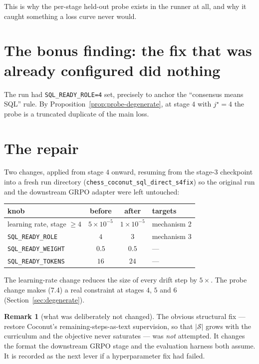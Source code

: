 \documentclass[11pt]{article}
\theoremstyle{definition}
\newtheorem{remark}[theorem]{Remark}
\begin{document}
This is why the per-stage held-out probe exists in the runner at all, and why it caught something a loss curve never would.

\section{The bonus finding: the fix that was already configured did nothing}

The run had \texttt{SQL\_READY\_ROLE=4} set, precisely to anchor the ``consensus means SQL'' rule. By Proposition~\ref{prop:probe-degenerate}, at stage $4$ with $j^\star=4$ the probe is a truncated duplicate of the main loss.

\begin{center}
\end{center}

\section{The repair}

Two changes, applied from stage $4$ onward, resuming from the stage-3 checkpoint into a fresh run directory (\texttt{chess\_coconut\_sql\_direct\_s4fix}) so the original run and the downstream GRPO adapter were left untouched:

\begin{center}
\begin{tabular}{lccl}
\toprule
knob & before & after & targets \\
\midrule
learning rate, stage $\ge 4$ & $5\times10^{-5}$ & $1\times10^{-5}$ & mechanism 2 \\
\texttt{SQL\_READY\_ROLE} & $4$ & $3$ & mechanism 3 \\
\texttt{SQL\_READY\_WEIGHT} & $0.5$ & $0.5$ & --- \\
\texttt{SQL\_READY\_TOKENS} & $16$ & $24$ & --- \\
\bottomrule
\end{tabular}
\end{center}

The learning-rate change reduces the size of every drift step by $5\times$. The probe change makes (7.4) a real constraint at stages $4$, $5$ and $6$ (Section~\ref{sec:degenerate}).

\begin{remark}[what was deliberately not changed]
The obvious structural fix --- restore Coconut's remaining-steps-as-text supervision, so that $|\mathcal{S}|$ grows with the curriculum and the objective never saturates --- was \emph{not} attempted. It changes the format the downstream GRPO stage and the evaluation harness both assume. It is recorded as the next lever if a hyperparameter fix had failed.
\end{remark}
\end{document}
